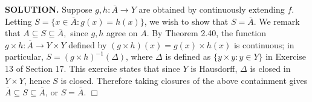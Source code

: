 \documentclass{article}
\begin{document}
\begin{enumerate}
    {\bf SOLUTION.} Suppose $g, h: \overline{A} \rightarrow Y$ are obtained by continuously extending $f$. Letting $S = \{x \in \overline{A}: g(x) = h(x)\}$, we wish to show that $S = \overline{A}$. We remark that $A \subseteq S \subseteq \overline{A},$ since $g, h$ agree on $A$. By Theorem 2.40, the function $g \times h: \overline{A} \rightarrow Y \times Y$ defined by $(g \times h)(x) = g(x) \times h(x)$ is continuous; in particular, $S = (g \times h)^{-1}(\Delta)$, where $\Delta$ is defined as $\{y \times y: y \in Y\}$ in Exercise 13 of Section 17. This exercise states that since $Y$ is Hausdorff, $\Delta$ is closed in $Y \times Y$, hence $S$ is closed. Therefore taking closures of the above containment gives $\overline{A} \subseteq S \subseteq \overline{A}$, or $S = \overline{A}$. $\Box$
\end{enumerate}
\end{document}

